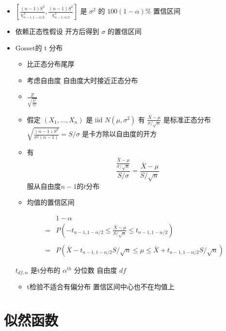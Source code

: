 \documentclass[
]{book}
\providecommand{\tightlist}{%
  \setlength{\itemsep}{0pt}\setlength{\parskip}{0pt}}
\begin{document}
\begin{itemize}
\item
  \(\left[\frac{(n-1)S^2}{\chi^2_{n-1,1-\alpha/2}}, \frac{(n-1)S^2}{\chi^2_{n-1,\alpha/2}}\right]\) 是 \(\sigma^2\) 的 \(100(1-\alpha)\%\) 置信区间
\item
  依赖正态性假设 开方后得到 \(\sigma\) 的置信区间
\item
  Gosset的 t 分布

  \begin{itemize}
  \tightlist
  \item
    比正态分布尾厚
  \item
    考虑自由度 自由度大时接近正态分布
  \item
    \(\frac{Z}{\sqrt{\frac{\chi^2}{df}}}\)
  \item
    假定 \((X_1,\ldots,X_n)\) 是 iid \(N(\mu,\sigma^2)\) 有 \(\frac{\bar X - \mu}{\sigma / \sqrt{n}}\) 是标准正态分布 \(\sqrt{\frac{(n - 1) S^2}{\sigma^2 (n - 1)}} = S / \sigma\) 是卡方除以自由度的开方
  \item
    有
    \[
    \frac{\frac{\bar X - \mu}{\sigma /\sqrt{n}}}{S/\sigma}  
    = \frac{\bar X - \mu}{S/\sqrt{n}}
    \]
    服从自由度\(n-1\)的\(t\)分布
  \item
    均值的置信区间
  \end{itemize}

  \begin{eqnarray*}
  &   & 1 - \alpha \\
  & = & P\left(-t_{n-1,1-\alpha/2} \leq \frac{\bar X - \mu}{S/\sqrt{n}} \leq t_{n-1,1-\alpha/2}\right) \\ \\
  & = & P\left(\bar X - t_{n-1,1-\alpha/2} S / \sqrt{n} \leq \mu  
      \leq \bar X + t_{n-1,1-\alpha/2}S /\sqrt{n}\right)
  \end{eqnarray*}

  \(t_{df,\alpha}\) 是t分布的 \(\alpha^{th}\) 分位数 自由度 \(df\)

  \begin{itemize}
  \tightlist
  \item
    t检验不适合有偏分布 置信区间中心也不在均值上
  \end{itemize}
\end{itemize}

\hypertarget{ux4f3cux7136ux51fdux6570}{%
\section{似然函数}\label{ux4f3cux7136ux51fdux6570}}
\end{document}
